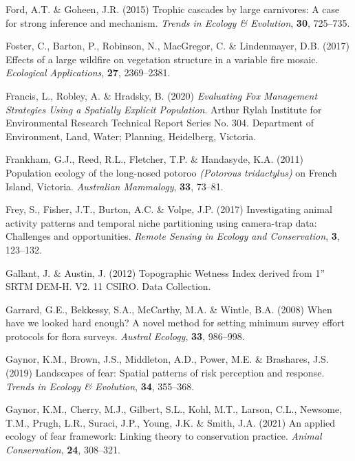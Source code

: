\documentclass[11pt,a4paper,titlepage,twoside,openright]{style/unimelbthesis}
\begin{document}
\begin{mainmatter}
\leavevmode\hypertarget{ref-ford2015trophic}{}%
Ford, A.T. \& Goheen, J.R. (2015) Trophic cascades by large carnivores: A case for strong inference and mechanism. \emph{Trends in Ecology \& Evolution}, \textbf{30}, 725--735.

\leavevmode\hypertarget{ref-foster2017effects}{}%
Foster, C., Barton, P., Robinson, N., MacGregor, C. \& Lindenmayer, D.B. (2017) Effects of a large wildfire on vegetation structure in a variable fire mosaic. \emph{Ecological Applications}, \textbf{27}, 2369--2381.

\leavevmode\hypertarget{ref-francis2020evaluating}{}%
Francis, L., Robley, A. \& Hradsky, B. (2020) \emph{Evaluating Fox Management Strategies Using a Spatially Explicit Population}. Arthur Rylah Institute for Environmental Research Technical Report Series No. 304. Department of Environment, Land, Water; Planning, Heidelberg, Victoria.

\leavevmode\hypertarget{ref-frankham2011population}{}%
Frankham, G.J., Reed, R.L., Fletcher, T.P. \& Handasyde, K.A. (2011) Population ecology of the long-nosed potoroo \emph{(Potorous tridactylus)} on French Island, Victoria. \emph{Australian Mammalogy}, \textbf{33}, 73--81.

\leavevmode\hypertarget{ref-frey2017investigating}{}%
Frey, S., Fisher, J.T., Burton, A.C. \& Volpe, J.P. (2017) Investigating animal activity patterns and temporal niche partitioning using camera-trap data: Challenges and opportunities. \emph{Remote Sensing in Ecology and Conservation}, \textbf{3}, 123--132.

\leavevmode\hypertarget{ref-gallant2012topographic}{}%
Gallant, J. \& Austin, J. (2012) Topographic Wetness Index derived from 1'' SRTM DEM-H. V2. 11 CSIRO. Data Collection.

\leavevmode\hypertarget{ref-garrard2008when}{}%
Garrard, G.E., Bekkessy, S.A., McCarthy, M.A. \& Wintle, B.A. (2008) When have we looked hard enough? A novel method for setting minimum survey effort protocols for flora surveys. \emph{Austral Ecology}, \textbf{33}, 986--998.

\leavevmode\hypertarget{ref-gaynor2019landscapes}{}%
Gaynor, K.M., Brown, J.S., Middleton, A.D., Power, M.E. \& Brashares, J.S. (2019) Landscapes of fear: Spatial patterns of risk perception and response. \emph{Trends in Ecology \& Evolution}, \textbf{34}, 355--368.

\leavevmode\hypertarget{ref-gaynor2021applied}{}%
Gaynor, K.M., Cherry, M.J., Gilbert, S.L., Kohl, M.T., Larson, C.L., Newsome, T.M., Prugh, L.R., Suraci, J.P., Young, J.K. \& Smith, J.A. (2021) An applied ecology of fear framework: Linking theory to conservation practice. \emph{Animal Conservation}, \textbf{24}, 308--321.


\end{mainmatter}
\end{document}
